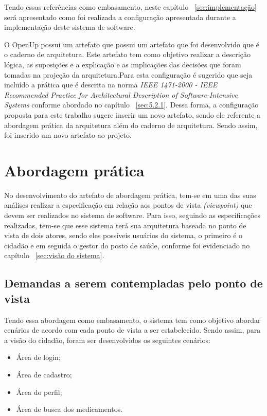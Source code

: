 Tendo essas referências como embasamento, neste capítulo ~\ref{sec:implementação} será apresentado como foi realizada a configuração apresentada durante a implementação deste sistema de software.

O \acrfull{OpenUp} possui um artefato que possui um artefato que foi desenvolvido que é o caderno de arquitetura. Este artefato tem como objetivo realizar a descrição lógica, as suposições e a explicação e as implicações das decisões que foram tomadas na projeção da arquitetura\cite{openup}.Para esta configuração é sugerido que seja incluído a prática que é descrita na norma \emph{IEEE 1471-2000 - IEEE Recommended Practice for Architectural Description of Software-Intensive Systems} conforme abordado no capítulo ~\ref{sec:5.2.1}. Dessa forma, a configuração proposta para este trabalho sugere inserir um novo artefato, sendo ele referente a abordagem prática da arquitetura além do caderno de arquitetura. Sendo assim, foi inserido um novo artefato ao projeto.

\section{Abordagem prática}
No desenvolvimento do artefato de abordagem prática, tem-se em uma das suas análises realizar a especificação em relação aos pontos de vista \emph{(viewpoint)} que devem ser realizados no sistema de software. Para isso, seguindo as especificações realizadas, tem-se que esse sistema terá sua arquitetura baseada no ponto de vista de dois atores, sendo eles possíveis usuários do sistema, o primeiro é o cidadão e em seguida o gestor do posto de saúde, conforme foi evidenciado no capítulo  ~\ref{sec:visão do sistema}.

\subsection{Demandas a serem contempladas pelo ponto de vista}

Tendo essa abordagem como embasamento, o sistema tem como objetivo abordar cenários de acordo com cada ponto de vista a ser estabelecido. Sendo assim, para a visão do cidadão, foram ser desenvolvidos os seguintes cenários:
\begin{itemize}
    \item Área de login;
    \item Área de cadastro;
    \item Área do perfil;
    \item Área de busca dos medicamentos.
\end{itemize}

